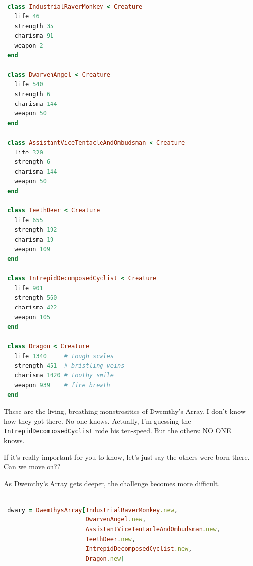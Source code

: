 \documentclass[10pt,twoside]{report}
\begin{document}
\begin{lstlisting}[basicstyle=\ttfamily\color{basiccolor},
    commentstyle = \ttfamily\color{commentcolor},
    keywordstyle=\ttfamily\color{keywordscolor},
    stringstyle=\color{stringcolor},
    language=Ruby,
    basicstyle=\small\ttfamily,
    showstringspaces=false,
  ]

 class IndustrialRaverMonkey < Creature
   life 46
   strength 35
   charisma 91
   weapon 2
 end

 class DwarvenAngel < Creature
   life 540
   strength 6
   charisma 144
   weapon 50
 end

 class AssistantViceTentacleAndOmbudsman < Creature
   life 320
   strength 6
   charisma 144
   weapon 50
 end

 class TeethDeer < Creature
   life 655
   strength 192
   charisma 19
   weapon 109
 end

 class IntrepidDecomposedCyclist < Creature
   life 901
   strength 560
   charisma 422
   weapon 105
 end

 class Dragon < Creature
   life 1340     # tough scales
   strength 451  # bristling veins
   charisma 1020 # toothy smile
   weapon 939    # fire breath
 end

\end{lstlisting}


These are the living, breathing monstrosities of Dwemthy's Array.  I
don't know how they got there.  No one knows.  Actually, I'm guessing
the \lstinline[breaklines=true]|IntrepidDecomposedCyclist| rode his
ten-speed.  But the others: NO ONE knows.

If it's really important for you to know, let's just say the others
were born there. Can we move on??

As Dwemthy's Array gets deeper, the challenge becomes more difficult.


\begin{lstlisting}[basicstyle=\ttfamily\color{basiccolor},
    commentstyle = \ttfamily\color{commentcolor},
    keywordstyle=\ttfamily\color{keywordscolor},
    stringstyle=\color{stringcolor},
    language=Ruby,
    basicstyle=\small\ttfamily,
    showstringspaces=false,
  ]

 dwary = DwemthysArray[IndustrialRaverMonkey.new,
                       DwarvenAngel.new,
                       AssistantViceTentacleAndOmbudsman.new,
                       TeethDeer.new,
                       IntrepidDecomposedCyclist.new,
                       Dragon.new]

\end{lstlisting}
\end{document}
